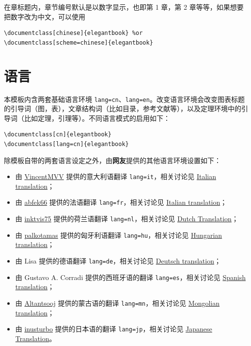 \documentclass[lang=cn,10pt]{elegantbook}
\begin{document}
在章标题内，章节编号默认是以数字显示，也即{\kaishu 第 1 章}，{\kaishu 第 2 章}等等，如果想要把数字改为中文，可以使用
\begin{lstlisting}
\documentclass[chinese]{elegantbook} %or
\documentclass[scheme=chinese]{elegantbook}
\end{lstlisting}



\section{语言}
本模板内含两套基础语言环境 \lstinline{lang=cn}、\lstinline{lang=en}。改变语言环境会改变图表标题的引导词（图，表），文章结构词（比如目录，参考文献等），以及定理环境中的引导词（比如定理，引理等）。不同语言模式的启用如下：
\begin{lstlisting}
\documentclass[cn]{elegantbook} 
\documentclass[lang=cn]{elegantbook}
\end{lstlisting}

除模板自带的两套语言设定之外，由\textbf{网友}提供的其他语言环境设置如下：
\begin{itemize}
  \item 由 \href{https://github.com/VincentMVV}{VincentMVV} 提供的意大利语翻译 \lstinline{lang=it}，相关讨论见 \href{https://github.com/ElegantLaTeX/ElegantBook/issues/85}{Italian translation}；
  \item 由 \href{https://github.com/abfek66}{abfek66} 提供的法语翻译 \lstinline{lang=fr}，相关讨论见 \href{https://github.com/ElegantLaTeX/ElegantBook/issues/85}{Italian translation}；
  \item 由 \href{https://github.com/inktvis75}{inktvis75} 提供的荷兰语翻译 \lstinline{lang=nl}，相关讨论见 \href{https://github.com/ElegantLaTeX/ElegantBook/issues/108}{Dutch Translation}；
  \item 由 \href{https://github.com/palkotamas}{palkotamas} 提供的匈牙利语翻译 \lstinline{lang=hu}，相关讨论见 \href{https://github.com/ElegantLaTeX/ElegantBook/issues/111}{Hungarian translation}；
  \item 由 Lisa 提供的德语翻译 \lstinline{lang=de}，相关讨论见 \href{https://github.com/ElegantLaTeX/ElegantBook/issues/113}{Deutsch translation}；
  \item 由 Gustavo A. Corradi 提供的西班牙语的翻译 \lstinline{lang=es}，相关讨论见 \href{https://github.com/ElegantLaTeX/ElegantBook/issues/133}{Spanish translation}；
  \item 由 \href{https://github.com/Altantsooj}{Altantsooj} 提供的蒙古语的翻译 \lstinline{lang=mn}，相关讨论见 \href{https://github.com/ElegantLaTeX/ElegantBook/issues/137}{Mongolian translation}；
  \item 由 \href{https://github.com/inusturbo}{inusturbo} 提供的日本语的翻译 \lstinline{lang=jp}，相关讨论见 \href{https://github.com/ElegantLaTeX/ElegantBook/issues/172}{Japanese Translation}。
\end{itemize}
\end{document}
